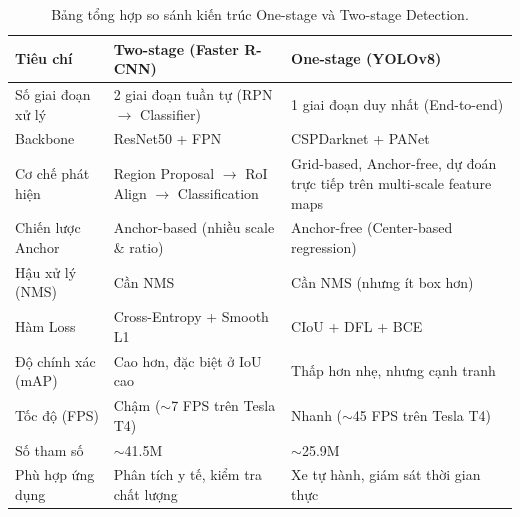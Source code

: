 \documentclass[a4paper]{article}
\theoremstyle{definition}
\begin{document}
\begin{table}[H]
	\centering
	\caption{Bảng tổng hợp so sánh kiến trúc One-stage và Two-stage Detection.}
	\label{tab:one-vs-two-stage}
	\begin{tabular}{|l|p{5.2cm}|p{5.2cm}|}
		\hline
		\textbf{Tiêu chí}  & \textbf{Two-stage (Faster R-CNN)}                                    & \textbf{One-stage (YOLOv8)}                                              \\
		\hline
		Số giai đoạn xử lý & 2 giai đoạn tuần tự (RPN $\rightarrow$ Classifier)                   & 1 giai đoạn duy nhất (End-to-end)                                        \\
		\hline
		Backbone           & ResNet50 + FPN                                                       & CSPDarknet + PANet                                                       \\
		\hline
		Cơ chế phát hiện   & Region Proposal $\rightarrow$ RoI Align $\rightarrow$ Classification & Grid-based, Anchor-free, dự đoán trực tiếp trên multi-scale feature maps \\
		\hline
		Chiến lược Anchor  & Anchor-based (nhiều scale \& ratio)                                  & Anchor-free (Center-based regression)                                    \\
		\hline
		Hậu xử lý (NMS)    & Cần NMS                                                              & Cần NMS (nhưng ít box hơn)                                               \\
		\hline
		Hàm Loss           & Cross-Entropy + Smooth L1                                            & CIoU + DFL + BCE                                                         \\
		\hline
		Độ chính xác (mAP) & Cao hơn, đặc biệt ở IoU cao                                          & Thấp hơn nhẹ, nhưng cạnh tranh                                           \\
		\hline
		Tốc độ (FPS)       & Chậm ($\sim$7 FPS trên Tesla T4)                                     & Nhanh ($\sim$45 FPS trên Tesla T4)                                       \\
		\hline
		Số tham số         & $\sim$41.5M                                                          & $\sim$25.9M                                                              \\
		\hline
		Phù hợp ứng dụng   & Phân tích y tế, kiểm tra chất lượng                                  & Xe tự hành, giám sát thời gian thực                                      \\
		\hline
	\end{tabular}
\end{table}
\end{document}
